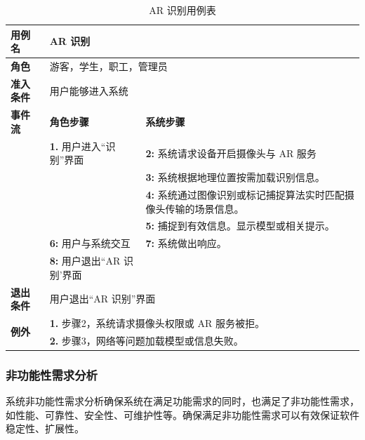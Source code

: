 \begin{table}[H]
  \centering
  \renewcommand\arraystretch{1.1}
  \small
  \caption{AR 识别用例表}
  \label{table:AR 识别用例表}
  \setlength{\tabcolsep}{4mm}
  \begin{tabular}{|p{2cm}|p{5.75cm}|p{5.75cm}|}
    \hline \textbf{用例名} & \multicolumn{2}{l|}{AR 识别} \\
    \hline \textbf{角色} & \multicolumn{2}{l|}{游客，学生，职工，管理员} \\
    \hline \textbf{准入条件} & \multicolumn{2}{l|}{用户能够进入系统} \\
    \hline \textbf{事件流} & \textbf{角色步骤} & \textbf{系统步骤} \\
    \hline \multirow{3}{*}{~} & \textbf{1.} 用户进入``识别''界面  & \textbf{2:} 系统请求设备开启摄像头与 AR 服务   \\
    \cline{2-3} &  & \textbf{3:} 系统根据地理位置按需加载识别信息。\\
    \cline{2-3} &  & \textbf{4:} 系统通过图像识别或标记捕捉算法实时匹配摄像头传输的场景信息。 \\
    \cline{2-3} &  & \textbf{5:} 捕捉到有效信息。显示模型或相关提示。 \\
    \cline{2-3} & \textbf{6:} 用户与系统交互 & \textbf{7:} 系统做出响应。 \\
    \cline{2-3} & \textbf{8:} 用户退出``AR 识别'界面  &  \\
    \hline \textbf{退出条件}  & \multicolumn{2}{l|}{用户退出``AR 识别''界面} \\
    \hline \multirow{2}{*}{\textbf{例外}} & \multicolumn{2}{l|}{\textbf{1.} 步骤2，系统请求摄像头权限或 AR 服务被拒。} \\
    & \multicolumn{2}{l|}{\textbf{2.} 步骤3，网络等问题加载模型或信息失败。} \\
    \hline
  \end{tabular}
\end{table}

\subsubsection{非功能性需求分析}

系统非功能性需求分析确保系统在满足功能需求的同时，也满足了非功能性需求，如性能、可靠性、安全性、可维护性等。确保满足非功能性需求可以有效保证软件稳定性、扩展性\cite{张宏升2011软件架构的非功能性需求指标和区域化支持}。

